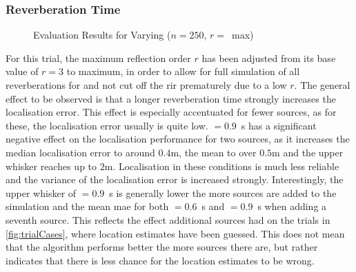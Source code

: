 \subsubsection*{Reverberation Time}
\begin{figure}[H]
\iftoggle{quick}{%
    \texttt{[image: plots/boxplots/boxplot-joined-T60]}
}{%
    
}%
	\caption[Evaluation Results for Varying \Tsixty]{Evaluation Results for Varying \Tsixty ($n=250$, $r=$~max)}
	\label{fig:trialT60}
\end{figure}

For this trial, the maximum reflection order $r$ has been adjusted from its base value of $r=3$ to maximum, in order to allow for full simulation of all reverberations for  and not cut off the \gls{rir} prematurely due to a low $r$. The general effect to be observed is that a longer reverberation time strongly increases the localisation error. This effect is especially accentuated for fewer sources, as for these, the localisation error usually is quite low. \Tsixty$=0.9$~s has a significant negative effect on the localisation performance for two sources, as it increases the median localisation error to around $0.4$m, the mean to over $0.5$m and the upper whisker reaches up to $2$m. Localisation in these conditions is much less reliable and the variance of the localisation error is increased strongly. Interestingly, the upper whisker of \Tsixty$=0.9$~s is generally lower the more sources are added to the simulation and the mean \gls{mae} for both \Tsixty$=0.6$~s and \Tsixty$=0.9$~s when adding a seventh source. This reflects the effect additional sources had on the trials in \autoref{fig:trialCases}, where location estimates have been guessed. This does not mean that the algorithm performs better the more sources there are, but rather indicates that there is less chance for the location estimates to be wrong.